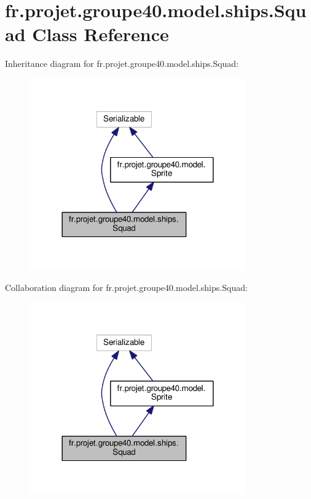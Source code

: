 \hypertarget{classfr_1_1projet_1_1groupe40_1_1model_1_1ships_1_1_squad}{}\section{fr.\+projet.\+groupe40.\+model.\+ships.\+Squad Class Reference}
\label{classfr_1_1projet_1_1groupe40_1_1model_1_1ships_1_1_squad}


Inheritance diagram for fr.\+projet.\+groupe40.\+model.\+ships.\+Squad\+:\nopagebreak
\begin{figure}[H]
\begin{center}
\leavevmode
\includegraphics[width=264pt]{classfr_1_1projet_1_1groupe40_1_1model_1_1ships_1_1_squad__inherit__graph}
\end{center}
\end{figure}


Collaboration diagram for fr.\+projet.\+groupe40.\+model.\+ships.\+Squad\+:\nopagebreak
\begin{figure}[H]
\begin{center}
\leavevmode
\includegraphics[width=264pt]{classfr_1_1projet_1_1groupe40_1_1model_1_1ships_1_1_squad__coll__graph}
\end{center}
\end{figure}
